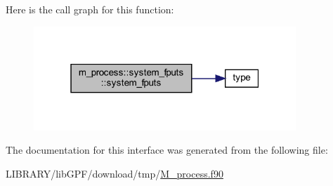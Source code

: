 Here is the call graph for this function\+:
\nopagebreak
\begin{figure}[H]
\begin{center}
\leavevmode
\includegraphics[width=280pt]{interfacem__process_1_1system__fputs_a0a084cac4baf5058a79af7f6490c3a89_cgraph}
\end{center}
\end{figure}


The documentation for this interface was generated from the following file\+:\begin{DoxyCompactItemize}
\item 
L\+I\+B\+R\+A\+R\+Y/lib\+G\+P\+F/download/tmp/\hyperlink{M__process_8f90}{M\+\_\+process.\+f90}\end{DoxyCompactItemize}
